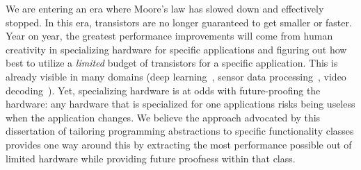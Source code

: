 We are entering an era where Moore's law has slowed down and effectively
stopped. In this era, transistors are no longer guaranteed to get smaller or
faster. Year on year, the greatest performance improvements will come from
human creativity in specializing hardware for specific applications and
figuring out how best to utilize a \textit{limited} budget of transistors for a
specific application. This is already visible in many domains (\eg deep
learning~\cite{tpu}, sensor data processing~\cite{m7}, video
decoding~\cite{qualcomm_video}). Yet, specializing hardware is at odds with
future-proofing the hardware: any hardware that is specialized for one
applications risks being useless when the application changes. We believe the
approach advocated by this dissertation of tailoring programming abstractions
to specific functionality classes provides one way around this by extracting
the most performance possible out of limited hardware while providing future
proofness within that class.
